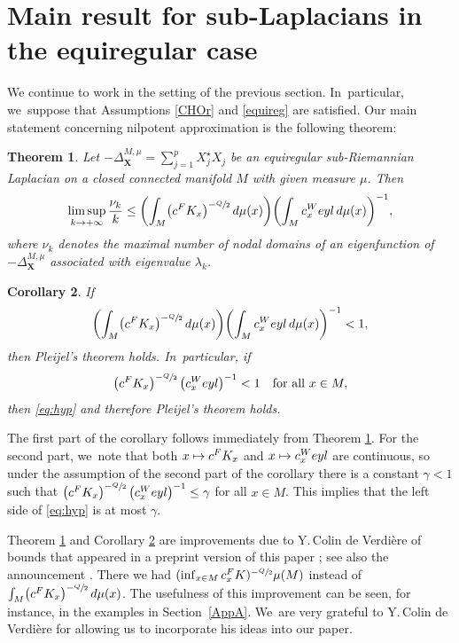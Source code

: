 \documentclass[11pt]{article}
\newcommand\mto{\mathchoice{\longmapsto}{\mapsto}{\mapsto}{\mapsto}}
\let\oldsfrac\sfrac
\renewcommand{\sfrac}[2]{{\oldsfrac{#1}{#2}}}
\newcommand{\FK}{\textup{FK}}
\newcommand{\Weyl}{\textup{Weyl}}
\newcommand{\bX}{{\boldsymbol{X}}}
\newtheorem{theorem}{Theorem}[section]
\newtheorem{corollary}[theorem]{Corollary}
\theoremstyle{definition}
\let\Xb\bX
\newcommand{\1}{\mathbbm{1}}
\numberwithin{equation}{section}
\begin{document}
\section{Main result for sub-Laplacians in the equiregular case}\label{sec:mainsubriem}

We continue to work in the setting of the previous section. In~particular, we~suppose that Assumptions \ref{CHOr} and \ref{equireg} are satisfied. Our main statement concerning nilpotent approximation is the following theorem:

\begin{theorem}\label{t:manifold}
Let $-\Delta_\Xb^{M,\mu} =\sum_{j=1}^p X_j^\star X_j$ be an equiregular sub-Riemannian Laplacian on a closed connected manifold $M$ with given measure $\mu$. Then
\begin{equation}\label{eq:mainmfd}
\limsup_{k\to+\infty} \frac{\nu_k}{k} \leq \biggl(\int_M \bigl(c^\FK_x \bigr)^{-\sfrac Q2} \,d\mu(x) \biggr) \biggl(\int_M c_x^\Weyl \,d\mu(x) \biggr)^{-1},
\end{equation}
where $\nu_k$ denotes the maximal number of nodal domains of an eigenfunction of $-\Delta_\Xb^{M,\mu}$ associated with eigenvalue $\lambda_k$.
\end{theorem}

\begin{corollary}\label{maincor}
If
\begin{equation}\label{eq:hyp}
\biggl(\int_M \bigl(c^\FK_x \bigr)^{-\sfrac Q2} \,d\mu(x) \biggr) \biggl(\int_M c_x^\Weyl \,d\mu(x) \biggr)^{-1} < 1,
\end{equation}
then Pleijel's theorem holds. In~particular, if
\[
\bigl(c^\FK_x \bigr)^{-\sfrac Q2} \,\bigl(c_x^\Weyl \bigr)^{-1} < 1
\quad\text{for all}\ x\in M,
\]
then \eqref{eq:hyp} and therefore Pleijel's theorem holds.
\end{corollary}

The first part of the corollary follows immediately from Theorem \ref{t:manifold}. For the second part, we~note that both $x\mto c^\FK_x$ and $x\mto c_x^\Weyl$ are continuous, so under the assumption of the second part of the corollary there is a constant $\gamma<1$ such that $\bigl(c^\FK_x \bigr)^{-\sfrac Q2} \,\bigl(c_x^\Weyl \bigr)^{-1}\leq\gamma$ for all $x\in M$. This implies that the left side of \eqref{eq:hyp} is at most $\gamma$.

Theorem \ref{t:manifold} and Corollary \ref{maincor} are improvements due to Y.\,Colin de Verdière of bounds that appeared in a preprint version of this paper \cite{FrHe1}; see also the announcement \cite{FrHe2}. There we had $(\inf_{x\in M} c_x^\FK)^{-\sfrac Q2} \mu(M)$ instead of $\int_M \bigl(c^\FK_x \bigr)^{-\sfrac Q2} \,d\mu(x)$. The usefulness of this improvement can be seen, for instance, in the examples in Section~\ref{AppA}. We~are very grateful to Y.\,Colin de Verdière for allowing us to incorporate his ideas into our paper.
\end{document}
